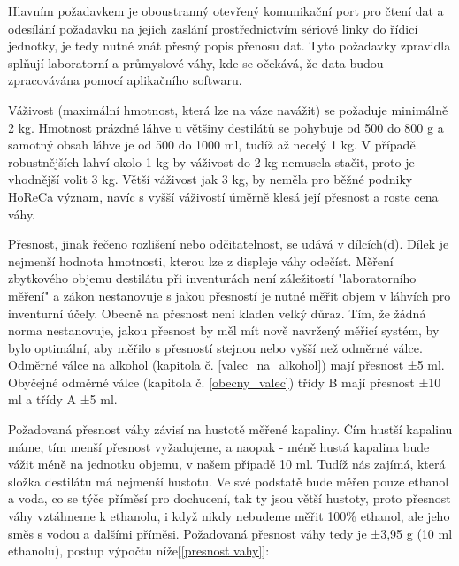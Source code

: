 


Hlavním požadavkem je oboustranný otevřený komunikační port pro čtení dat a odesílání požadavku na jejich zaslání prostřednictvím sériové linky do řídicí jednotky, je tedy nutné znát přesný popis přenosu dat. Tyto požadavky zpravidla splňují laboratorní a průmyslové váhy, kde se očekává, že data budou zpracovávána pomocí aplikačního softwaru.

Váživost (maximální hmotnost, která lze na váze navážit) se požaduje minimálně 2 kg. Hmotnost prázdné láhve u většiny destilátů se pohybuje od 500 do 800 g a samotný obsah láhve je od 500 do 1000 ml, tudíž až necelý 1 kg. V případě robustnějších lahví okolo 1 kg by váživost do 2 kg nemusela stačit, proto je vhodnější volit 3 kg. Větší váživost jak 3 kg, by neměla pro běžné podniky HoReCa význam, navíc s vyšší váživostí úměrně klesá její přesnost a roste cena váhy.

Přesnost, jinak řečeno rozlišení nebo odčitatelnost, se udává v dílcích(d). Dílek je nejmenší hodnota hmotnosti, kterou lze z displeje váhy odečíst.\cite{vazivost} Měření zbytkového objemu destilátu při inventurách není záležitostí "laboratorního měření" a zákon nestanovuje s jakou přesností je nutné měřit objem v láhvích pro inventurní účely. Obecně na 
přesnost není kladen velký důraz. Tím, že žádná norma nestanovuje, jakou přesnost by měl mít nově navržený měřicí systém, by bylo optimální, aby měřilo s přesností stejnou nebo vyšší než odměrné válce. Odměrné válce na alkohol
(kapitola č. \ref{valec_na_alkohol}) mají přesnost ±5 ml. Obyčejné odměrné válce (kapitola č. \ref{obecny_valec}) třídy B mají přesnost ±10 ml a třídy A ±5 ml.

Požadovaná přesnost váhy závisí na hustotě měřené kapaliny.  Čím hustší kapalinu máme, tím menší přesnost vyžadujeme, a naopak - méně hustá kapalina bude vážit méně na jednotku objemu, v našem případě 10 ml. Tudíž nás zajímá, která složka destilátu má nejmenší hustotu. Ve své podstatě bude měřen pouze ethanol a voda, co se týče příměsí pro dochucení, tak ty jsou větší hustoty, proto přesnost váhy vztáhneme k ethanolu, i když nikdy nebudeme měřit 100\% ethanol, ale jeho směs s vodou a dalšími příměsi. Požadovaná přesnost váhy tedy je ±3,95 g (10 ml ethanolu), postup výpočtu níže[\ref{presnost vahy}]:\\

